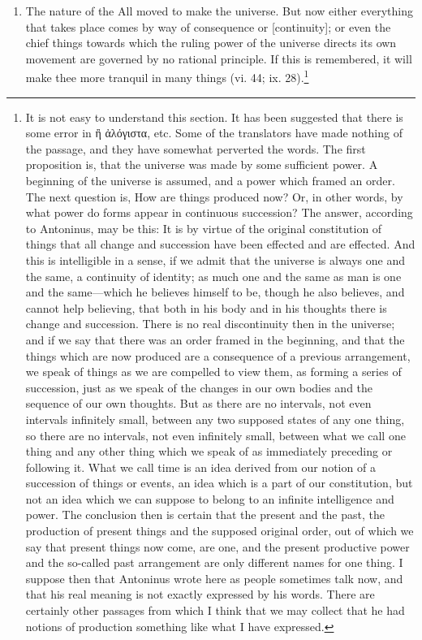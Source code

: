 \begin{enumerate}
\item The nature of the All moved to make the universe. But now either everything that takes place comes by way of consequence or [{\clarify continuity}]; or even the chief things towards which the ruling power of the universe directs its own movement are governed by no rational principle. If this is remembered, it will make thee more tranquil in many things (vi. 44; ix. 28).\footnote{It is not easy to understand this section. It has been suggested that there is some error in \textgreek{ἢ ἀλόγιστα}, etc. Some of the translators have made nothing of the passage, and they have somewhat perverted the words. The first proposition is, that the universe was made by some sufficient power. A beginning of the universe is assumed, and a power which framed an order. The next question is, How are things produced now? Or, in other words, by what power do forms appear in continuous succession? The answer, according to Antoninus, may be this: It is by virtue of the original constitution of things that all change and succession have been effected and are effected. And this is intelligible in a sense, if we admit that the universe is always one and the same, a continuity of identity; as much one and the same as man is one and the same—which he believes himself to be, though he also believes, and cannot help believing, that both in his body and in his thoughts there is change and succession. There is no real discontinuity then in the universe; and if we say that there was an order framed in the beginning, and that the things which are now produced are a consequence of a previous arrangement, we speak of things as we are compelled to view them, as forming a series of succession, just as we speak of the changes in our own bodies and the sequence of our own thoughts. But as there are no intervals, not even intervals infinitely small, between any two supposed states of any one thing, so there are no intervals, not even infinitely small, between what we call one thing and any other thing which we speak of as immediately preceding or following it. What we call time is an idea derived from our notion of a succession of things or events, an idea which is a part of our constitution, but not an idea which we can suppose to belong to an infinite intelligence and power. The conclusion then is certain that the present and the past, the production of present things and the supposed original order, out of which we say that present things now come, are one, and the present productive power and the so-called past arrangement are only different names for one thing. I suppose then that Antoninus wrote here as people sometimes talk now, and that his real meaning is not exactly expressed by his words. There are certainly other passages from which I think that we may collect that he had notions of production something like what I have expressed.

}
\end{enumerate}
